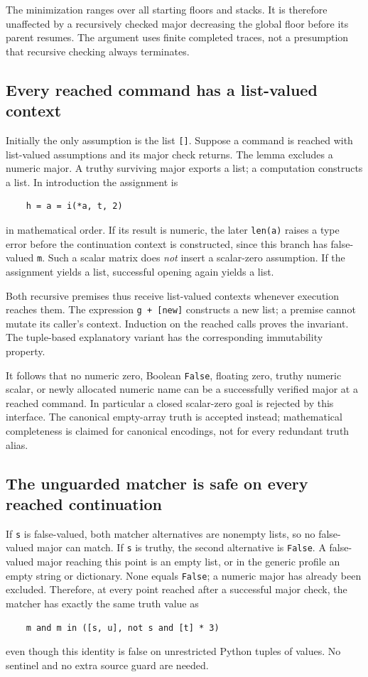 The minimization ranges over all starting floors and stacks.  It is
therefore unaffected by a recursively checked major decreasing the
global floor before its parent resumes.  The argument uses finite
completed traces, not a presumption that recursive checking always
terminates.

\subsection{Every reached command has a list-valued context}

Initially the only assumption is the list \texttt{[]}.  Suppose a
command is reached with list-valued assumptions and its major check
returns.  The lemma excludes a numeric major.  A truthy surviving major
exports a list; a computation constructs a list.  In introduction the
assignment is
\begin{verbatim}
    h = a = i(*a, t, 2)
\end{verbatim}
in mathematical order.  If its result is numeric, the later
\texttt{len(a)} raises a type error before the continuation context is
constructed, since this branch has false-valued \texttt{m}.  Such a
scalar matrix does \emph{not} insert a scalar-zero assumption.  If the
assignment yields a list, successful opening again yields a list.

Both recursive premises thus receive list-valued contexts whenever
execution reaches them.  The expression \texttt{g + [new]} constructs a
new list; a premise cannot mutate its caller's context.  Induction on
the reached calls proves the invariant.  The tuple-based explanatory
variant has the corresponding immutability property.

It follows that no numeric zero, Boolean \texttt{False}, floating zero,
truthy numeric scalar, or newly allocated numeric name can be a
successfully verified major at a reached command.  In particular a
closed scalar-zero goal is rejected by this interface.  The canonical
empty-array truth is accepted instead; mathematical completeness is
claimed for canonical encodings, not for every redundant truth alias.

\subsection{The unguarded matcher is safe on every reached continuation}

If \texttt{s} is false-valued, both matcher alternatives are nonempty
lists, so no false-valued major can match.  If \texttt{s} is truthy, the
second alternative is \texttt{False}.  A false-valued major reaching
this point is an empty list, or in the generic profile an empty string
or dictionary.  None equals \texttt{False}; a numeric major has already
been excluded.  Therefore, at every point reached after a successful
major check, the matcher has exactly the same truth value as
\begin{verbatim}
    m and m in ([s, u], not s and [t] * 3)
\end{verbatim}
even though this identity is false on unrestricted Python tuples of
values.  No sentinel and no extra source guard are needed.

